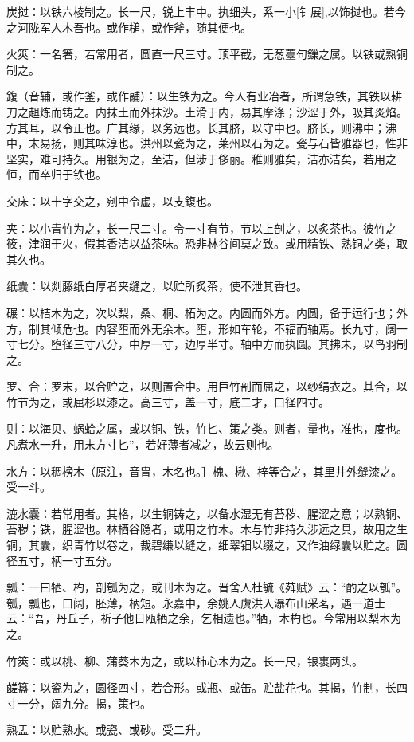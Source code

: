 \documentclass[]{article}
\begin{document}
炭挝：以铁六棱制之。长一尺，锐上丰中。执细头，系一小{[}钅展{]},以饰挝也。若今之河陇军人木吾也。或作槌，或作斧，随其便也。

火筴：一名箸，若常用者，圆直一尺三寸。顶平截，无葱薹句鏁之属。以铁或熟铜制之。

鍑（音辅，或作釜，或作鬴）：以生铁为之。今人有业冶者，所谓急铁，其铁以耕刀之趄炼而铸之。内抹土而外抹沙。土滑于内，易其摩涤；沙涩于外，吸其炎焰。方其耳，以令正也。广其缘，以务远也。长其脐，以守中也。脐长，则沸中；沸中，末易扬，则其味淳也。洪州以瓷为之，莱州以石为之。瓷与石皆雅器也，性非坚实，难可持久。用银为之，至洁，但涉于侈丽。稚则雅矣，洁亦洁矣，若用之恒，而卒归于铁也。

交床：以十字交之，剜中令虚，以支鍑也。

夹：以小青竹为之，长一尺二寸。令一寸有节，节以上剖之，以炙茶也。彼竹之筱，津润于火，假其香洁以益茶味。恐非林谷间莫之致。或用精铁、熟铜之类，取其久也。

纸囊：以剡藤纸白厚者夹缝之，以贮所炙茶，使不泄其香也。

碾：以桔木为之，次以梨，桑、桐、柘为之。内圆而外方。内圆，备于运行也；外方，制其倾危也。内容堕而外无余木。堕，形如车轮，不辐而轴焉。长九寸，阔一寸七分。堕径三寸八分，中厚一寸，边厚半寸。轴中方而执圆。其拂未，以鸟羽制之。

罗、合：罗末，以合贮之，以则置合中。用巨竹剖而屈之，以纱绢衣之。其合，以竹节为之，或屈杉以漆之。高三寸，盖一寸，底二才，口径四寸。

则：以海贝、蜗蛤之属，或以铜、铁，竹匕、策之类。则者，量也，准也，度也。凡煮水一升，用末方寸匕''，若好薄者减之，故云则也。

水方：以稠榜木（原注，音胄，木名也。］槐、楸、梓等合之，其里井外缝漆之。受一斗。

漉水囊：若常用者。其格，以生铜铸之，以备水湿无有苔秽、腥涩之意；以熟铜、苔秽；铁，腥涩也。林栖谷隐者，或用之竹木。木与竹非持久涉远之具，故用之生铜，其囊，织青竹以卷之，裁碧缣以缝之，细翠钿以缀之，又作油绿囊以贮之。圆径五寸，柄一寸五分。

瓢：一曰牺、杓，剖瓠为之，或刊木为之。晋舍人杜毓《荈赋》云：``酌之以瓠''。瓠，瓢也，口阔，胚薄，柄短。永嘉中，余姚人虞洪入瀑布山采茗，遇一道士云：``吾，丹丘子，祈子他日瓯牺之余，乞相遗也。''牺，木杓也。今常用以梨木为之。

竹筴：或以桃、柳、蒲葵木为之，或以柿心木为之。长一尺，银裹两头。

鹾簋：以瓷为之，圆径四寸，若合形。或瓶、或缶。贮盐花也。其揭，竹制，长四寸一分，阔九分。揭，策也。

熟盂：以贮熟水。或瓷、或砂。受二升。
\end{document}
